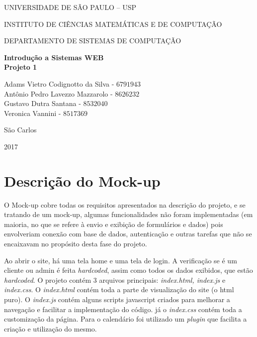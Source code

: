 \documentclass[10pt,a4paper]{article}
\newcommand*\NewPage{\newpage\null\thispagestyle{empty}\newpage}
\begin{document}
\thispagestyle{empty}
\begin{center}
	UNIVERSIDADE DE SÃO PAULO – USP
	
	INSTITUTO DE CIÊNCIAS MATEMÁTICAS E DE COMPUTAÇÃO
	
	DEPARTAMENTO DE SISTEMAS DE COMPUTAÇÃO
	
	\vspace{7cm}
	
	\Large{\textbf{Introdução a Sistemas WEB}}\\
	\small{\textbf{Projeto 1}}
	
	\vspace{6cm}
	
	Adams Vietro Codignotto da Silva - $6791943$ \\ 
	Antônio Pedro Lavezzo Mazzarolo - $8626232$ \\
	Gustavo Dutra Santana - $8532040$\\
	Veronica Vannini - $8517369$\\
	
	\vspace{6cm}
	
	São Carlos
	
	2017
\end{center}

\NewPage
{}

\tableofcontents

\newpage

\section{Descrição do Mock-up}

O Mock-up cobre todas os requisitos apresentados na descrição do projeto, e se tratando de um mock-up, algumas funcionalidades não foram implementadas (em maioria, no que se refere à envio e exibição de formulários e dados) pois envolveriam conexão com base de dados, autenticação e outras tarefas que não se encaixavam no propósito desta fase do projeto.

Ao abrir o site, há uma tela home e uma tela de login. A verificação se é um cliente ou admin é feita \textit{hardcoded}, assim como todos os dados exibidos, que estão \textit{hardcoded}. O projeto contém 3 arquivos principais: \textit{index.html, index.js} e \textit{index.css}. O \textit{index.html} contém toda a parte de visualização do site (o html puro). O \textit{index.js} contém alguns scripts javascript criados para melhorar a navegação e facilitar a implementação do código. já o \textit{index.css} contém toda a customização da página. Para o calendário foi utilizado um \textit{plugin} que facilita a criação e utilização do mesmo.
\end{document}
